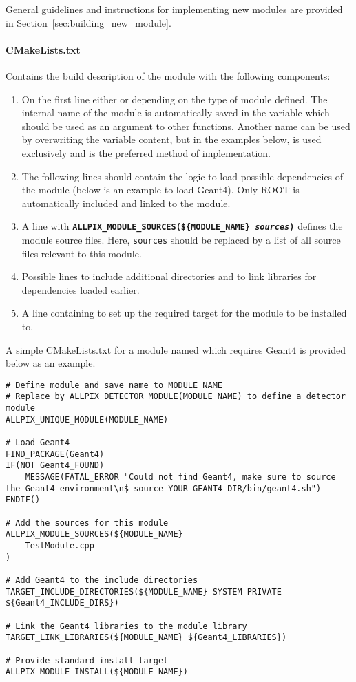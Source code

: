 General guidelines and instructions for implementing new modules are provided in Section~\ref{sec:building_new_module}.

\paragraph{CMakeLists.txt}
Contains the build description of the module with the following components:
\begin{enumerate}
\item On the first line either  or  depending on the type of module defined.
The internal name of the module is automatically saved in the variable  which should be used as an argument to other functions.
Another name can be used by overwriting the variable content, but in the examples below,  is used exclusively and is the preferred method of implementation.
\item The following lines should contain the logic to load possible dependencies of the module (below is an example to load Geant4).
Only ROOT is automatically included and linked to the module.
\item A line with \texttt{\textbf{ALLPIX\_MODULE\_SOURCES(\$\{MODULE\_NAME\} \textit{sources})}} defines the module source files. Here, \texttt{sources} should be replaced by a list of all source files relevant to this module.
\item Possible lines to include additional directories and to link libraries for dependencies loaded earlier.
\item A line containing  to set up the required target for the module to be installed to.
\end{enumerate}

A simple CMakeLists.txt for a module named  which requires Geant4 is provided below as an example.
\vspace{5pt}

\begin{verbatim}
# Define module and save name to MODULE_NAME
# Replace by ALLPIX_DETECTOR_MODULE(MODULE_NAME) to define a detector module
ALLPIX_UNIQUE_MODULE(MODULE_NAME)

# Load Geant4
FIND_PACKAGE(Geant4)
IF(NOT Geant4_FOUND)
    MESSAGE(FATAL_ERROR "Could not find Geant4, make sure to source the Geant4 environment\n$ source YOUR_GEANT4_DIR/bin/geant4.sh")
ENDIF()

# Add the sources for this module
ALLPIX_MODULE_SOURCES(${MODULE_NAME}
    TestModule.cpp
)

# Add Geant4 to the include directories
TARGET_INCLUDE_DIRECTORIES(${MODULE_NAME} SYSTEM PRIVATE ${Geant4_INCLUDE_DIRS})

# Link the Geant4 libraries to the module library
TARGET_LINK_LIBRARIES(${MODULE_NAME} ${Geant4_LIBRARIES})

# Provide standard install target
ALLPIX_MODULE_INSTALL(${MODULE_NAME})
\end{verbatim}

